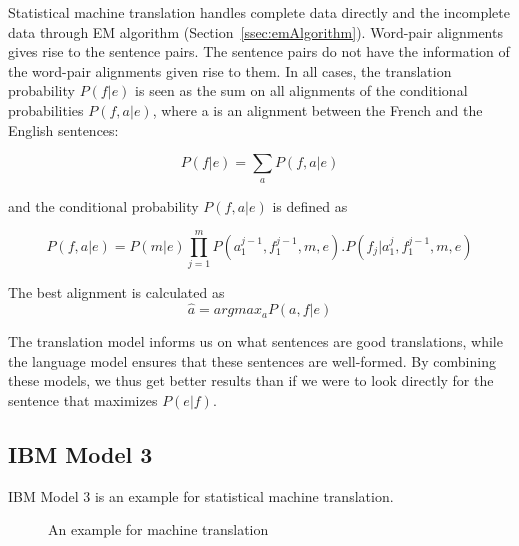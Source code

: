 \documentclass{bmcart}
\begin{document}
Statistical machine translation handles complete data directly and the incomplete data through EM algorithm (Section~\ref{ssec:emAlgorithm}). Word-pair alignments gives rise to the sentence pairs. The sentence pairs do not have the information of the word-pair alignments given rise to them.
In all cases, the translation probability $P(f|e)$ is seen as the sum on all alignments of the conditional probabilities $P(f,a|e)$, where a is an alignment between the French and the English sentences:
\begin{center}
\begin{equation}
P(f|e) = \sum_a P(f,a|e)
\end{equation}
\label{eqn:transitionProb}
\end{center} and the conditional probability $P(f,a|e)$ is defined as 
\begin{center}
\begin{equation}
P(f,a|e)=P(m|e) \prod_{j=1}^{m} P( a_{1}^{j-1},f_{1}^{j-1},m,e) . P(f_{j} | a_{1}^{j}, f_{1}^{j-1},m,e)
\end{equation}
\end{center}

The best alignment is calculated as 
\begin{equation}
\hat{a}=argmax_aP(a,f|e)
\end{equation}

The translation model informs us on what sentences are good translations, while the language model ensures that these sentences are well-formed. By combining these models, we thus get better results than if we were to look directly for the sentence that maximizes $P(e|f)$.

\subsection{IBM Model 3}
\label{ssec:ibmModel3}
IBM Model 3 is an example for statistical machine translation. 

\hspace{-5mm}
\begin{figure}[h!tb]
\begin{minipage}{0.45\textwidth}
\centering
{}
\end{minipage}%
\begin{minipage}{0.45\textwidth}
\centering
{}
\end{minipage}
\caption{An example for machine translation}
\label{fig:mtExample}
\end{figure}
\end{document}
